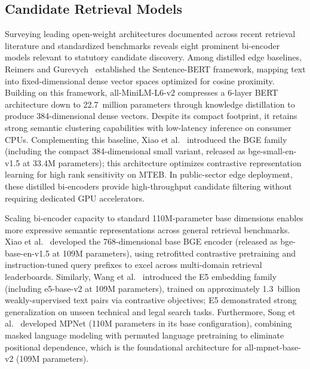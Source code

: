     \subsection{Candidate Retrieval Models}
    \label{sec:ir_candidate_models}
    Surveying leading open-weight architectures documented across recent retrieval literature and standardized benchmarks reveals eight prominent bi-encoder models relevant to statutory candidate discovery. Among distilled edge baselines, Reimers and Gurevych~\cite{reimers2019sentencebert} established the Sentence-BERT framework, mapping text into fixed-dimensional dense vector spaces optimized for cosine proximity. Building on this framework, all-MiniLM-L6-v2 compresses a 6-layer BERT architecture down to 22.7~million parameters through knowledge distillation to produce 384-dimensional dense vectors. Despite its compact footprint, it retains strong semantic clustering capabilities with low-latency inference on consumer CPUs. Complementing this baseline, Xiao et al.~\cite{xiao2024bge} introduced the BGE family (including the compact 384-dimensional small variant, released as bge-small-en-v1.5 at 33.4M parameters); this architecture optimizes contrastive representation learning for high rank sensitivity on MTEB. In public-sector edge deployment, these distilled bi-encoders provide high-throughput candidate filtering without requiring dedicated GPU accelerators.

    Scaling bi-encoder capacity to standard 110M-parameter base dimensions enables more expressive semantic representations across general retrieval benchmarks. Xiao et al.~\cite{xiao2024bge} developed the 768-dimensional base BGE encoder (released as bge-base-en-v1.5 at 109M parameters), using retrofitted contrastive pretraining and instruction-tuned query prefixes to excel across multi-domain retrieval leaderboards. Similarly, Wang et al.~\cite{wang2022text} introduced the E5 embedding family (including e5-base-v2 at 109M parameters), trained on approximately 1.3~billion weakly-supervised text pairs via contrastive objectives; E5 demonstrated strong generalization on unseen technical and legal search tasks. Furthermore, Song et al.~\cite{song2020mpnet} developed MPNet (110M parameters in its base configuration), combining masked language modeling with permuted language pretraining to eliminate positional dependence, which is the foundational architecture for all-mpnet-base-v2 (109M parameters).

